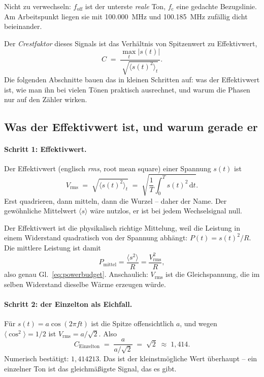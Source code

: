 \documentclass[11pt,a4paper]{article}
\newcommand{\crest}{\ensuremath{C}}
\begin{document}
Nicht zu verwechseln: $f_\mathrm{off}$ ist der unterste \emph{reale} Ton,
$f_\mathrm{c}$ eine gedachte Bezugslinie. Am Arbeitspunkt liegen sie mit
\SI{100.000}{\mega\hertz} und \SI{100.185}{\mega\hertz} zufällig dicht
beieinander.

Der \emph{Crestfaktor} dieses Signals ist das Verhältnis von Spitzenwert zu
Effektivwert,
\begin{equation}
  \crest \;=\; \frac{\max_t |s(t)|}{\sqrt{\bigl\langle s(t)^2\bigr\rangle_t}} .
  \label{eq:crestdef}
\end{equation}
Die folgenden Abschnitte bauen das in kleinen Schritten auf: was der
Effektivwert ist, wie man ihn bei vielen Tönen praktisch ausrechnet, und
warum die Phasen nur auf den Zähler wirken.

\subsection{Was der Effektivwert ist, und warum gerade er}

\paragraph{Schritt 1: Effektivwert.}
Der Effektivwert (englisch \emph{rms}, root mean square) einer Spannung
$s(t)$ ist
\begin{equation}
  V_\mathrm{rms} \;=\; \sqrt{\bigl\langle s(t)^2 \bigr\rangle_t}
  \;=\; \sqrt{\frac{1}{T}\int_0^{T} s(t)^2\,\mathrm{d}t} .
  \label{eq:rmsdef}
\end{equation}
Erst quadrieren, dann mitteln, dann die Wurzel -- daher der Name. Der
gewöhnliche Mittelwert $\langle s\rangle$ wäre nutzlos, er ist bei jedem
Wechselsignal null.

Der Effektivwert ist die physikalisch richtige Mittelung, weil die Leistung
in einem Widerstand quadratisch von der Spannung abhängt:
$P(t) = s(t)^2/R$. Die mittlere Leistung ist damit
\begin{equation}
  P_\mathrm{mittel} = \frac{\langle s^2\rangle}{R} = \frac{V_\mathrm{rms}^2}{R} ,
\end{equation}
also genau Gl.~\eqref{eq:powerbudget}. Anschaulich: $V_\mathrm{rms}$ ist die
Gleichspannung, die im selben Widerstand dieselbe Wärme erzeugen würde.

\paragraph{Schritt 2: der Einzelton als Eichfall.}
Für $s(t) = a\cos(2\pi f t)$ ist die Spitze offensichtlich $a$, und wegen
$\langle\cos^2\rangle = 1/2$ ist $V_\mathrm{rms} = a/\sqrt{2}$. Also
\begin{equation}
  \crest_\text{Einzelton} \;=\; \frac{a}{a/\sqrt{2}} \;=\; \sqrt{2} \;\approx\; 1{,}414 .
\end{equation}
Numerisch bestätigt: $1{,}414213$. Das ist der kleinstmögliche Wert überhaupt
-- ein einzelner Ton ist das gleichmäßigste Signal, das es gibt.
\end{document}

